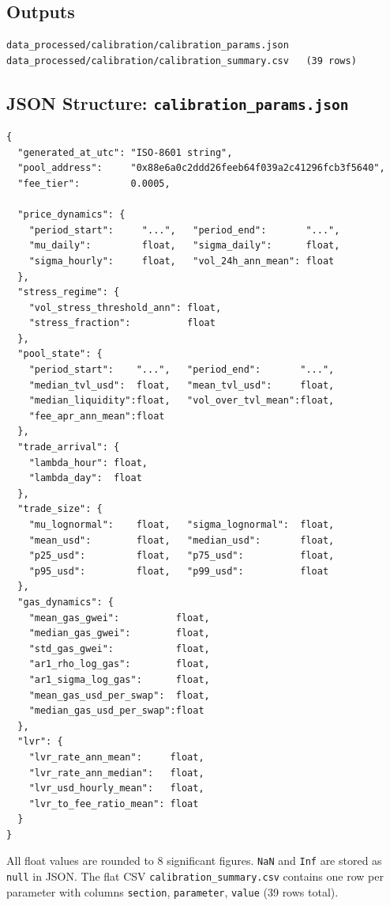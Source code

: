 \documentclass[11pt,a4paper]{article}
\begin{document}
\subsection{Outputs}

\begin{lstlisting}
data_processed/calibration/calibration_params.json
data_processed/calibration/calibration_summary.csv   (39 rows)
\end{lstlisting}

\subsection{JSON Structure: \texttt{calibration\_params.json}}

\begin{lstlisting}
{
  "generated_at_utc": "ISO-8601 string",
  "pool_address":     "0x88e6a0c2ddd26feeb64f039a2c41296fcb3f5640",
  "fee_tier":         0.0005,

  "price_dynamics": {
    "period_start":     "...",   "period_end":       "...",
    "mu_daily":         float,   "sigma_daily":      float,
    "sigma_hourly":     float,   "vol_24h_ann_mean": float
  },
  "stress_regime": {
    "vol_stress_threshold_ann": float,
    "stress_fraction":          float
  },
  "pool_state": {
    "period_start":    "...",   "period_end":       "...",
    "median_tvl_usd":  float,   "mean_tvl_usd":     float,
    "median_liquidity":float,   "vol_over_tvl_mean":float,
    "fee_apr_ann_mean":float
  },
  "trade_arrival": {
    "lambda_hour": float,
    "lambda_day":  float
  },
  "trade_size": {
    "mu_lognormal":    float,   "sigma_lognormal":  float,
    "mean_usd":        float,   "median_usd":       float,
    "p25_usd":         float,   "p75_usd":          float,
    "p95_usd":         float,   "p99_usd":          float
  },
  "gas_dynamics": {
    "mean_gas_gwei":          float,
    "median_gas_gwei":        float,
    "std_gas_gwei":           float,
    "ar1_rho_log_gas":        float,
    "ar1_sigma_log_gas":      float,
    "mean_gas_usd_per_swap":  float,
    "median_gas_usd_per_swap":float
  },
  "lvr": {
    "lvr_rate_ann_mean":     float,
    "lvr_rate_ann_median":   float,
    "lvr_usd_hourly_mean":   float,
    "lvr_to_fee_ratio_mean": float
  }
}
\end{lstlisting}

All float values are rounded to 8 significant figures.
\texttt{NaN} and \texttt{Inf} are stored as \texttt{null} in JSON.
The flat CSV \texttt{calibration\_summary.csv} contains one row per
parameter with columns \texttt{section}, \texttt{parameter},
\texttt{value} (39 rows total).
\end{document}
